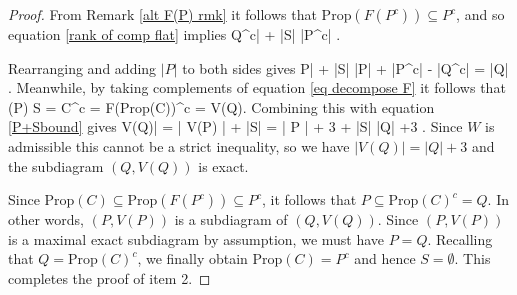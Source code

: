 \documentclass[11pt]{article}
\newcommand{\rk}{\textrm{rk} }
\def\ba #1\ea{\begin{align} #1 \end{align}}
\def\bas #1\eas{\begin{align*} #1 \end{align*}}
\newcommand{\Prop}{\textrm{Prop}}
\theoremstyle{remark}
\theoremstyle{definition}
\begin{document}
\begin{proof}
From Remark \ref{alt F(P) rmk} it follows that $\Prop (F(P^c)) \subseteq P^c$, and so equation \eqref{rank of comp flat} implies \bas |Q^c| + |S| \leq |P^c|  \;.\eas 

Rearranging and adding $|P|$ to both sides gives \ba |P| + |S| \leq |P| + |P^c| - |Q^c| = |Q| \;.\label{P+Sbound}\ea 
Meanwhile, by taking complements of equation \eqref{eq decompose F} it follows that
\bas V(P) \sqcup S = C^c = F(\Prop(C))^c  = V(Q)\;. \eas
Combining this with equation \eqref{P+Sbound} gives 
\ba |V(Q)| = | V(P) | + |S| = | P | + 3 + |S| \leq |Q| +3 \;. \label{Q defines exact}\ea
Since $W$ is admissible this cannot be a strict inequality, so we have $|V(Q)| = |Q| +3$ and the subdiagram $(Q, V(Q))$ is exact.

Since $\Prop(C) \subseteq \Prop(F(P^c)) \subseteq P^c$, it follows that $P \subseteq \Prop(C)^c = Q$. In other words, $(P, V(P))$ is a subdiagram of $(Q, V(Q))$. Since $(P, V(P))$ is a maximal exact subdiagram by assumption, we must have $P=Q$. Recalling that $Q = \Prop(C)^c$, we finally obtain $\Prop (C) = P^c$ and hence $S = \emptyset$. This completes the proof of item 2.
%
%
%

\end{proof}
\end{document}
